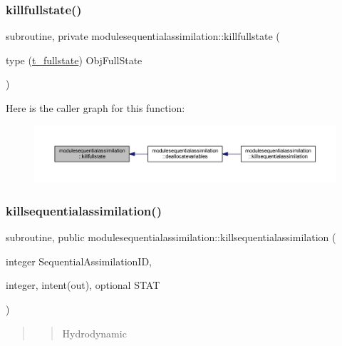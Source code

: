 \subsubsection{\texorpdfstring{killfullstate()}{killfullstate()}}
{\footnotesize\ttfamily subroutine, private modulesequentialassimilation\+::killfullstate (\begin{DoxyParamCaption}\item[{type (\mbox{\hyperlink{structmodulesequentialassimilation_1_1t__fullstate}{t\+\_\+fullstate}})}]{Obj\+Full\+State }\end{DoxyParamCaption})\hspace{0.3cm}{\ttfamily [private]}}

Here is the caller graph for this function\+:\nopagebreak
\begin{figure}[H]
\begin{center}
\leavevmode
\includegraphics[width=350pt]{namespacemodulesequentialassimilation_a7077ed60ddc61ad6d71f0df6d63bd587_icgraph}
\end{center}
\end{figure}
\mbox{\label{namespacemodulesequentialassimilation_a50ed5db30b7f431f2b333f7f86d5ef99}} 
\subsubsection{\texorpdfstring{killsequentialassimilation()}{killsequentialassimilation()}}
{\footnotesize\ttfamily subroutine, public modulesequentialassimilation\+::killsequentialassimilation (\begin{DoxyParamCaption}\item[{integer}]{Sequential\+Assimilation\+ID,  }\item[{integer, intent(out), optional}]{S\+T\+AT }\end{DoxyParamCaption})}

\begin{quote}
\begin{quote}
Hydrodynamic \end{quote}
\end{quote}


